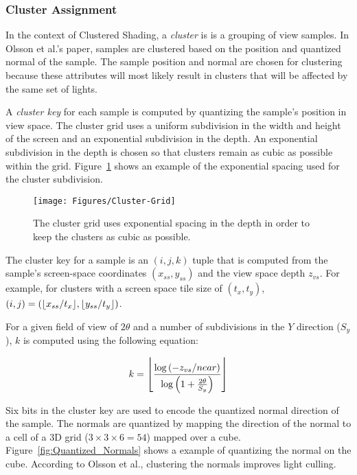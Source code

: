\subsubsection{Cluster Assignment}
\label{Cluster_Assignment}

In the context of Clustered Shading, a \emph{cluster} is is a grouping of view samples. In Olsson et al.'s paper, samples are clustered based on the position and quantized normal of the sample. The sample position and normal are chosen for clustering because these attributes will most likely result in clusters that will be affected by the same set of lights.

A \emph{cluster key} for each sample is computed by quantizing the sample's position in view space. The cluster grid uses a uniform subdivision in the width and height of the screen and an exponential subdivision in the depth. An exponential subdivision in the depth is chosen so that clusters remain as cubic as possible within the grid. Figure~\ref{fig:Cluster-Grid} shows an example of the exponential spacing used for the cluster subdivision.

\begin{figure}[h]
\centering
\texttt{[image: Figures/Cluster-Grid]}
\decoRule
\caption[Cluster Grid]{The cluster grid uses exponential spacing in the depth in order to keep the clusters as cubic as possible.}
\label{fig:Cluster-Grid}
\end{figure}

The cluster key for a sample is an $(i, j, k)$ tuple that is computed from the sample's screen-space coordinates $(x_{ss}, y_{ss})$ and the view space depth $z_{vs}$. For example, for clusters with a screen space tile size of $(t_x, t_y)$, $(i, j) = (\floor*{x_{ss}/t_x},\floor*{y_{ss}/t_y})$.

For a given field of view of $2\theta$ and a number of subdivisions in the $Y$ direction ($S_y$), $k$ is computed using the following equation:

\begin{equation}
k = \floor*{\frac{\log\left(-z_{vs}/near\right)}{\log\left(1+\frac{2\theta}{S_y}\right)}}
\label{eqn:Cluster-k}
\end{equation}

Six bits in the cluster key are used to encode the quantized normal direction of the sample. The normals are quantized by mapping the direction of the normal to a cell of a 3D grid ($3 \times 3 \times 6 = 54$) mapped over a cube. Figure~\ref{fig:Quantized_Normals} shows a example of quantizing the normal on the cube. According to Olsson et al., clustering the normals improves light culling.

